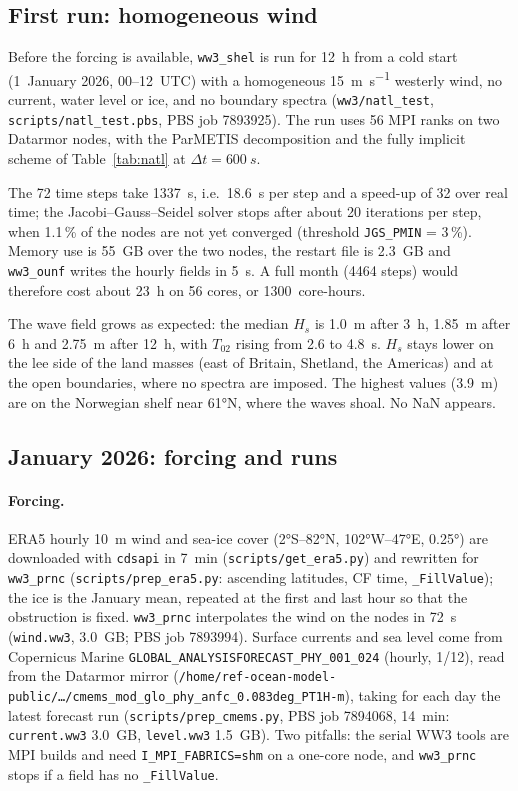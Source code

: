 \documentclass[11pt,a4paper]{article}
\begin{document}
\subsection{First run: homogeneous wind}
Before the forcing is available, \texttt{ww3\_shel} is run for \SI{12}{h}
from a cold start (1~January 2026, 00--12~UTC) with a homogeneous
\SI{15}{m.s^{-1}} westerly wind, no current, water level or ice, and no
boundary spectra (\texttt{ww3/natl\_test}, \texttt{scripts/natl\_test.pbs},
PBS job 7893925). The run uses 56 MPI ranks on two Datarmor nodes, with the
ParMETIS decomposition and the fully implicit scheme of
Table~\ref{tab:natl} at $\Delta t = \SI{600}{s}$.

The 72 time steps take \SI{1337}{s}, i.e.\ \SI{18.6}{s} per step and a
speed-up of 32 over real time; the Jacobi--Gauss--Seidel solver stops after
about 20 iterations per step, when 1.1\,\% of the nodes are not yet
converged (threshold \texttt{JGS\_PMIN} = 3\,\%). Memory use is
\SI{55}{GB} over the two nodes, the restart file is \SI{2.3}{GB} and
\texttt{ww3\_ounf} writes the hourly fields in \SI{5}{s}. A full month
(4464 steps) would therefore cost about \SI{23}{h} on 56 cores, or
1300~core-hours.

The wave field grows as expected: the median
$H_s$ is \SI{1.0}{m} after \SI{3}{h}, \SI{1.85}{m} after \SI{6}{h} and
\SI{2.75}{m} after \SI{12}{h}, with $T_{02}$ rising from 2.6 to
\SI{4.8}{s}. $H_s$ stays lower on the lee side of the land masses (east of
Britain, Shetland, the Americas) and at the open boundaries, where no
spectra are imposed. The highest values (\SI{3.9}{m}) are on the
Norwegian shelf near \ang{61}N, where the waves shoal. No NaN appears.

\subsection{January 2026: forcing and runs}
\paragraph{Forcing.} ERA5 hourly \SI{10}{m} wind and sea-ice cover
(\ang{2}S--\ang{82}N, \ang{102}W--\ang{47}E, \ang{0.25}) are downloaded with
\texttt{cdsapi} in \SI{7}{min} (\texttt{scripts/get\_era5.py}) and rewritten
for \texttt{ww3\_prnc} (\texttt{scripts/prep\_era5.py}: ascending latitudes,
CF time, \texttt{\_FillValue}); the ice is the January mean, repeated at the
first and last hour so that the obstruction is fixed. \texttt{ww3\_prnc}
interpolates the wind on the nodes in \SI{72}{s} (\texttt{wind.ww3},
\SI{3.0}{GB}; PBS job 7893994). Surface currents and sea level come from
Copernicus Marine \texttt{GLOBAL\_ANALYSISFORECAST\_PHY\_001\_024} (hourly,
1/12\textdegree), read from the Datarmor mirror
(\texttt{/home/ref-ocean-model-public/\dots/cmems\_mod\_glo\_phy\_anfc\_0.083deg\_PT1H-m}),
taking for each day the latest forecast run (\texttt{scripts/prep\_cmems.py},
PBS job 7894068, \SI{14}{min}: \texttt{current.ww3} \SI{3.0}{GB},
\texttt{level.ww3} \SI{1.5}{GB}). Two pitfalls: the serial WW3 tools are MPI
builds and need \texttt{I\_MPI\_FABRICS=shm} on a one-core node, and
\texttt{ww3\_prnc} stops if a field has no \texttt{\_FillValue}.
\end{document}
